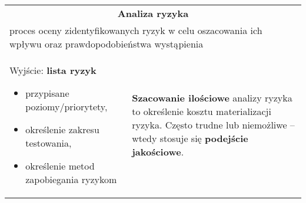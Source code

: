 \documentclass[../main.tex]{subfiles}
\begin{document}
    \begin{table}[H]
        \begin{center}
            \begin{tabular}{| p{8cm}  p{8cm} |}
                \hline
                \multicolumn{2}{|c|}{\textbf{Analiza ryzyka}}\\
                \multicolumn{2}{|p{16,5cm}|}{proces oceny zidentyfikowanych ryzyk w celu oszacowania ich wpływu
                oraz prawdopodobieństwa wystąpienia}\\
                \hline
                Wyjście: \textbf{lista ryzyk}
                \begin{itemize}
                    \item przypisane poziomy/priorytety,
                    \item określenie zakresu testowania,
                    \item określenie metod zapobiegania ryzykom
                \end{itemize}
                &
                \textbf{Szacowanie ilościowe} analizy ryzyka to określenie kosztu materializacji ryzyka.
                Często trudne lub niemożliwe – wtedy stosuje się \textbf{podejście jakościowe}.\\



\end{tabular}
\end{center}
\end{table}
\end{document}
